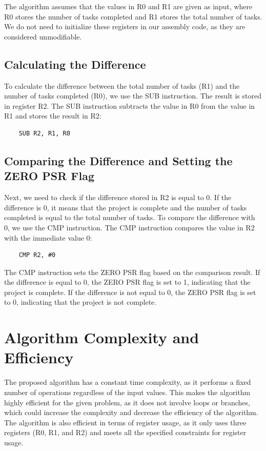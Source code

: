 The algorithm assumes that the values in R0 and R1 are given as input, where R0 stores the number of tasks completed and R1 stores the total number of tasks. We do not need to initialize these registers in our assembly code, as they are considered unmodifiable.

\subsection{Calculating the Difference}

To calculate the difference between the total number of tasks (R1) and the number of tasks completed (R0), we use the SUB instruction. The result is stored in register R2. The SUB instruction subtracts the value in R0 from the value in R1 and stores the result in R2:

\begin{verbatim}
    SUB R2, R1, R0
\end{verbatim}

\subsection{Comparing the Difference and Setting the ZERO PSR Flag}

Next, we need to check if the difference stored in R2 is equal to 0. If the difference is 0, it means that the project is complete and the number of tasks completed is equal to the total number of tasks. To compare the difference with 0, we use the CMP instruction. The CMP instruction compares the value in R2 with the immediate value 0:

\begin{verbatim}
    CMP R2, #0
\end{verbatim}

The CMP instruction sets the ZERO PSR flag based on the comparison result. If the difference is equal to 0, the ZERO PSR flag is set to 1, indicating that the project is complete. If the difference is not equal to 0, the ZERO PSR flag is set to 0, indicating that the project is not complete.

\section{Algorithm Complexity and Efficiency}

The proposed algorithm has a constant time complexity, as it performs a fixed number of operations regardless of the input values. This makes the algorithm highly efficient for the given problem, as it does not involve loops or branches, which could increase the complexity and decrease the efficiency of the algorithm. The algorithm is also efficient in terms of register usage, as it only uses three registers (R0, R1, and R2) and meets all the specified constraints for register usage.



